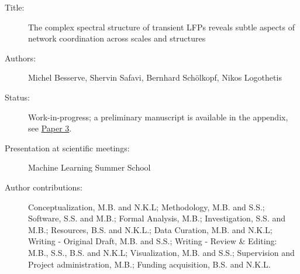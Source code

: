 \begin{description}
\item[Title:] The complex spectral structure of transient LFPs reveals subtle aspects of network coordination across scales and structures
\item[Authors:]
  Michel Besserve, Shervin Safavi, Bernhard Sch\"olkopf, Nikos Logothetis
\item[Status:]
  Work-in-progress; a preliminary  manuscript is available in the appendix,
  see \hyperref[pdf:besserve2020ned]{Paper 3}.
\item[Presentation at scientific meetings:]
  Machine Learning Summer School \cite{besservePracticalMachineLearning2016}
\item[Author contributions: ]

  Conceptualization, M.B. and N.K.L;
  Methodology, M.B. and S.S.;
  Software, S.S. and M.B.;
  Formal Analysis, M.B.;
  Investigation, S.S. and M.B.;
  Resources, B.S. and N.K.L.;
  Data Curation, M.B. and N.K.L;
  Writing - Original Draft, M.B. and S.S.;
  Writing - Review \& Editing: M.B., S.S., B.S. and N.K.L;
  Visualization, M.B. and S.S.;
  Supervision and Project administration,  M.B.;
  Funding acquisition, B.S. and N.K.L.

\end{description}


